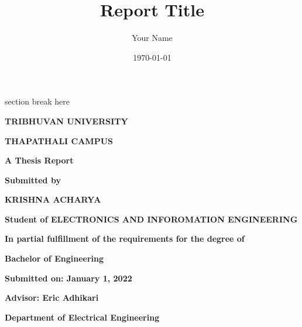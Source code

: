 \documentclass{report}
\begin{document}
\title{Report Title}
\author{Your Name}
\date{\today}

\begin{titlepage}
	
	
	
   
    section break here
    
    
    {\Large \bfseries TRIBHUVAN UNIVERSITY}
    
    \vspace{1cm}
    
    {\Large \bfseries THAPATHALI CAMPUS}
    
    \vspace{2cm}
    
    {\Huge \bfseries A Thesis Report}
    
    \vspace{1cm}
    
    {\Large \bfseries Submitted by}
    
    \vspace{1cm}
    
    {\Large \bfseries KRISHNA ACHARYA}
    
    {\large \bfseries Student of ELECTRONICS AND INFOROMATION ENGINEERING}
    
    \vspace{1cm}
    
    {\large \bfseries In partial fulfillment of the requirements for the degree of}
    
    {\large \bfseries Bachelor of Engineering}
    
    \vspace{1cm}
    
    {\large \bfseries Submitted on: January 1, 2022}
    
    \vspace{1cm}
    
    {\large \bfseries Advisor: Eric Adhikari}
    
    {\large \bfseries Department of Electrical Engineering}
    
    \end{titlepage}
    



\maketitle



\begin{abstract}
\end{abstract}

\tableofcontents

\listoffigures
\listoftables






\appendix


%
%
\end{document}

